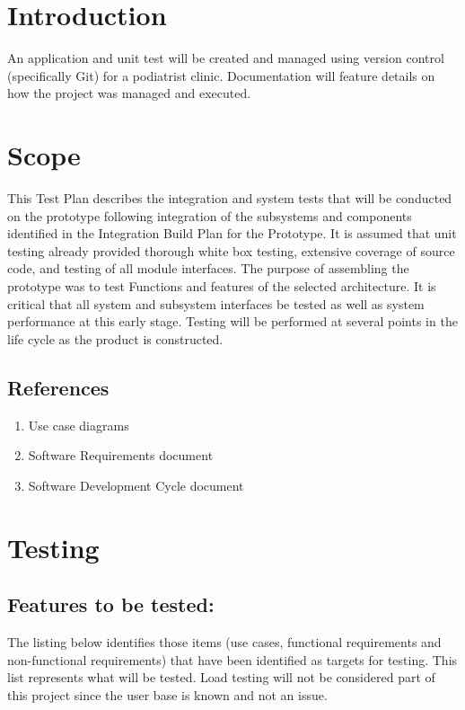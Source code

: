 \documentclass{unitemplate}
\begin{document}
	
\section{Introduction}
An application and unit test will be created and managed using version control (specifically Git) for a podiatrist clinic. Documentation will feature details on how the project was managed and executed.

\section{Scope}
This Test Plan describes the integration and system tests that will be conducted on the prototype following integration of the subsystems and components identified in the Integration Build Plan for the Prototype. It is assumed that unit testing already provided thorough white box testing, extensive coverage of source code, and testing of all module interfaces.
The purpose of assembling the prototype was to test Functions and features of the selected architecture. It is critical that all system and subsystem interfaces be tested as well as system performance at this early stage. Testing will be performed at several points in the life cycle as the product is constructed. 

\subsection{References}
    \begin{enumerate}
    \item Use case diagrams
    \item Software Requirements document
    \item Software Development Cycle document 
\end{enumerate}

\section{Testing}
\subsection{Features to be tested: }
The listing below identifies those items (use cases, functional requirements and non-functional requirements) that have been identified as targets for testing. This list represents what will be tested.
Load testing will not be considered part of this project since the user base is known and not an issue.
\end{document}
